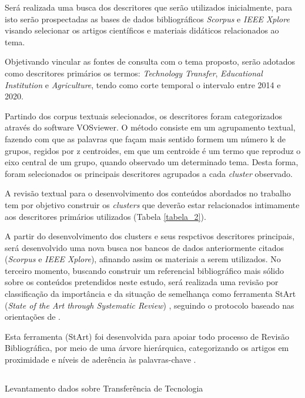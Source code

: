 Será realizada uma busca dos descritores que serão utilizados inicialmente, para isto serão prospectadas as bases de dados bibliográficos \textit{Scorpus} e \textit{IEEE Xplore} visando selecionar os artigos científicos e materiais didáticos relacionados ao tema.

Objetivando vincular as fontes de consulta com o tema proposto, serão adotados como descritores primários os termos: \textit{Technology Transfer}, \textit{Educational Institution} e \textit{Agriculture}, tendo como corte temporal o intervalo entre 2014 e 2020. 

Partindo dos corpus textuais selecionados, os descritores foram categorizados através do software VOSviewer. O método consiste em um agrupamento textual, fazendo com que as palavras que façam mais sentido formem um número k de grupos, regidos por z centroides, em que um centroide é um termo que reproduz o eixo central de um grupo, quando observado um determinado tema. Desta forma, foram selecionados os principais descritores agrupados a cada \textit{cluster} observado. 


A revisão textual para o desenvolvimento dos conteúdos abordados no trabalho tem por objetivo construir os \textit{clusters} que deverão estar relacionados intimamente aos descritores primários utilizados (Tabela \ref{tabela_2}). 



A partir do desenvolvimento dos clusters e seus respctivos descritores principais, será desenvolvido uma nova busca nos bancos de dados anteriormente citados (\textit{Scorpus} e \textit{IEEE Xplore}), afinando assim os materiais a serem utilizados. No terceiro momento, buscando construir um referencial bibliográfico mais sólido sobre os conteúdos pretendidos neste estudo, será realizada uma revisão por classificação da importância e da situação de semelhança como ferramenta StArt (\textit{State of the Art through Systematic Review}) \cite{lapes_start_2005}, seguindo o protocolo baseado nas orientações de . 

Esta ferramenta (StArt) foi desenvolvida para apoiar todo processo de Revisão Bibliográfica, por meio de uma árvore hierárquica, categorizando os artigos em proximidade e níveis de aderência às palavras-chave \cite{hernandes_avaliacao_2010}.


\subsection{}{Levantamento dados sobre Transferência de Tecnologia}

